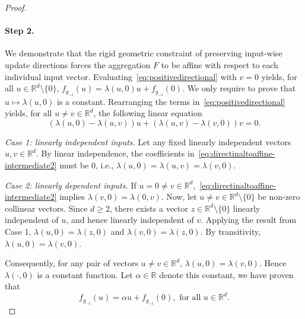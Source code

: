 \documentclass[twoside,11pt]{article}
\newcommand{\R}{\mathbb{R}}
\begin{document}
\begin{proof}
    \paragraph{Step 2.} We demonstrate that the rigid geometric constraint of preserving input-wise update directions forces the aggregation $F$ to be affine with respect to each individual input vector.
    Evaluating~\eqref{eq:positivedirectional} with $v=0$ yields, for all $u \in \R^d \setminus \{0\}$, $f_{g_{-i}}(u) = \lambda(u, 0)u + f_{g_{-i}}(0)$. 
    We only require to prove that $u \mapsto \lambda(u, 0)$ is a constant. 
    Rearranging the terms in~\eqref{eq:positivedirectional} yields, for all $u \neq v \in \R^d$, the following linear equation
    \begin{equation}\label{eq:directinaltoaffine-intermediate2} 
        (\lambda(u,0) - \lambda(u,v))u + (\lambda(u,v) - \lambda(v,0))v = 0. 
    \end{equation}

    \textit{Case 1: linearly independent inputs.}
    Let any fixed linearly independent vectors $u, v \in \R^d$. 
    By linear independence, the coefficients in~\eqref{eq:directinaltoaffine-intermediate2} must be $0$, i.e., $\lambda(u,0) = \lambda(u,v) = \lambda(v,0)$.

    \textit{Case 2: linearly dependent inputs.}
    If $u = 0 \neq v \in \R^d$,~\eqref{eq:directinaltoaffine-intermediate2} implies $\lambda(v,0) = \lambda(0,v)$.
    Now, let $u \neq v \in \R^d \setminus \{0\}$ be non-zero collinear vectors. 
    Since $d \ge 2$, there exists a vector $z \in \R^d \setminus \{0\}$ linearly independent of $u$, and hence linearly independent of $v$.
    Applying the result from Case 1, $\lambda(u,0) = \lambda(z,0)$ and $\lambda(v,0) = \lambda(z,0)$.
    By transitivity, $\lambda(u,0) = \lambda(v,0)$.

    Consequently, for any pair of vectors $u \neq v \in \R^d $, $\lambda(u,0) = \lambda(v,0)$. 
    Hence $\lambda(\cdot, 0)$ is a constant function.
    Let $\alpha \in \R$ denote this constant, we have proven that 
    \begin{equation}\label{eq:indexaffine-intermediate}
        f_{g_{-i}}(u) = \alpha u + f_{g_{-i}}(0), \text{ for all } u\in\R^d.
    \end{equation}



\end{proof}
\end{document}
